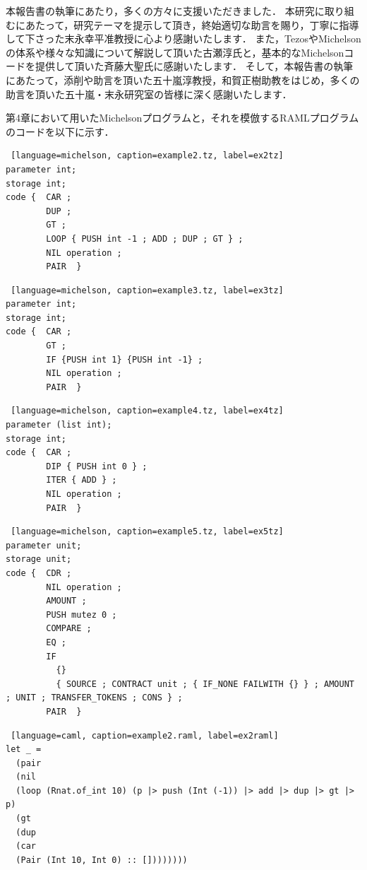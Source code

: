 \documentclass{kuisthesis}
\begin{document}
\acknowledgments
本報告書の執筆にあたり，多くの方々に支援いただきました．
本研究に取り組むにあたって，研究テーマを提示して頂き，終始適切な助言を賜り，丁寧に指導して下さった末永幸平准教授に心より感謝いたします．
また，TezosやMichelsonの体系や様々な知識について解説して頂いた古瀬淳氏と，基本的なMichelsonコードを提供して頂いた斉藤大聖氏に感謝いたします．
そして，本報告書の執筆にあたって，添削や助言を頂いた五十嵐淳教授，和賀正樹助教をはじめ，多くの助言を頂いた五十嵐・末永研究室の皆様に深く感謝いたします．

\nocite{*}



\appendix
第4章において用いたMichelsonプログラムと，それを模倣するRAMLプログラムのコードを以下に示す．

\begin{lstlisting} [language=michelson, caption=example2.tz, label=ex2tz]
parameter int;
storage int;
code {  CAR ;
        DUP ;
        GT ;
        LOOP { PUSH int -1 ; ADD ; DUP ; GT } ;
        NIL operation ;
        PAIR  }
\end{lstlisting}

\begin{lstlisting} [language=michelson, caption=example3.tz, label=ex3tz]
parameter int;
storage int;
code {  CAR ;
        GT ;
        IF {PUSH int 1} {PUSH int -1} ;
        NIL operation ;
        PAIR  }
\end{lstlisting}

\begin{lstlisting} [language=michelson, caption=example4.tz, label=ex4tz]
parameter (list int);
storage int;
code {  CAR ;
        DIP { PUSH int 0 } ;
        ITER { ADD } ;
        NIL operation ;
        PAIR  }
\end{lstlisting}

\begin{lstlisting} [language=michelson, caption=example5.tz, label=ex5tz]
parameter unit;
storage unit;
code {  CDR ;
        NIL operation ;
        AMOUNT ;
        PUSH mutez 0 ;
        COMPARE ;
        EQ ;
        IF
          {}
          { SOURCE ; CONTRACT unit ; { IF_NONE FAILWITH {} } ; AMOUNT ; UNIT ; TRANSFER_TOKENS ; CONS } ;
        PAIR  }
\end{lstlisting}

\begin{lstlisting} [language=caml, caption=example2.raml, label=ex2raml]
let _ =
  (pair
  (nil
  (loop (Rnat.of_int 10) (p |> push (Int (-1)) |> add |> dup |> gt |> p)
  (gt
  (dup
  (car
  (Pair (Int 10, Int 0) :: [])))))))
\end{lstlisting}
\end{document}
